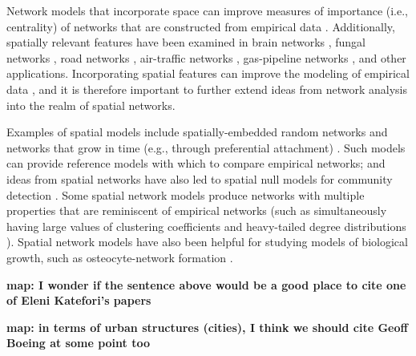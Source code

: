 \documentclass[%
 reprint,
 amsmath,amssymb,
 aps,
]{revtex4-1}
\begin{document}
Network models that incorporate space can improve measures of importance (i.e., centrality) of networks that are constructed from empirical data \cite{spatial1, air-traffic}. Additionally, spatially relevant features have been examined in brain networks \cite{braingrowth1, braingrowth2}, fungal networks \cite{fungal_data}, road networks \cite{road_data, spatial1, barbosa}, air-traffic networks \cite{air-traffic}, gas-pipeline networks \cite{spatialefficiency}, and other applications. Incorporating spatial features can improve the modeling of empirical data \cite{barthelemy}, and it is therefore important to further extend ideas from network analysis into the realm of spatial networks.

Examples of spatial models include spatially-embedded random networks \cite{penrose-rgg, geographical_threshold} and networks that grow in time (e.g., through preferential attachment) \cite{mean_field_evolving_spatial, SPA1, spatial1}. Such models can provide reference models with which to compare empirical networks; and ideas from spatial networks have also led to spatial null models for community detection \cite{community1, community2}. %
Some spatial network models produce networks with multiple properties that are reminiscent of empirical networks (such as simultaneously having large values of clustering coefficients and heavy-tailed degree distributions \cite{geometric_preferential_attachment, geographical_threshold2}). Spatial network models have also been helpful for studying models of biological growth, such as osteocyte-network formation \cite{mean_field_evolving_spatial}.

{\bf map: I wonder if the sentence above would be a good place to cite one of Eleni Katefori's papers}

{\bf map: in terms of urban structures (cities), I think we should cite Geoff Boeing at some point too}
\end{document}
